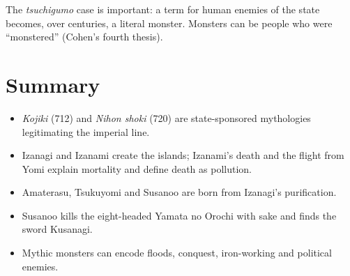 \begin{remark}
The \emph{tsuchigumo} case is important: a term for human enemies of the state becomes,
over centuries, a literal monster. Monsters can be people who were ``monstered''
(Cohen's fourth thesis).
\end{remark}

\section*{Summary}
\begin{itemize}
  \item \emph{Kojiki} (712) and \emph{Nihon shoki} (720) are state-sponsored mythologies
        legitimating the imperial line.
  \item Izanagi and Izanami create the islands; Izanami's death and the flight from Yomi
        explain mortality and define death as pollution.
  \item Amaterasu, Tsukuyomi and Susanoo are born from Izanagi's purification.
  \item Susanoo kills the eight-headed Yamata no Orochi with sake and finds the sword
        Kusanagi.
  \item Mythic monsters can encode floods, conquest, iron-working and political enemies.
\end{itemize}
